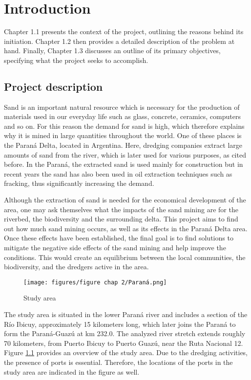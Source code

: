 \chapter{Introduction}
\label{chapter:introduction}

Chapter 1.1 presents the context of the project, outlining the reasons behind its initiation. Chapter 1.2 then provides a detailed description of the problem at hand. Finally, Chapter 1.3 discusses an outline of its primary objectives, specifying what the project seeks to accomplish.

\section{Project description}
Sand is an important natural resource which is necessary for the production of materials used in our everyday life such as glass, concrete, ceramics, computers and so on. For this reason the demand for sand is high, which therefore explains why it is mined in large quantities throughout the world. One of these places is the Paraná Delta, located in Argentina. Here, dredging companies extract large amounts of sand from the river, which is later used for various purposes, as cited before. In the Paraná, the extracted sand is used mainly for construction but in recent years the sand has also been used in oil extraction techniques such as fracking, thus significantly increasing the demand. 


Although the extraction of sand is needed for the economical development of the area, one may ask themselves what the impacts of the sand mining are for the riverbed, the biodiversity and the surrounding delta. This project aims to find out how much sand mining occurs, as well as its effects in the Paraná Delta area. Once these effects have been established, the final goal is to find solutions to mitigate the negative side effects of the sand mining and help improve the conditions. This would create an equilibrium between the local communities, the biodiversity, and the dredgers active in the area.

\begin{figure}[H]
    \centering    \texttt{[image: figures/figure chap 2/Paraná.png]}
    \caption{Study area}
    \label{fig:study area}
\end{figure}

The study area is situated in the lower Paraná river and includes a section of the Río Ibicuy, approximately 15 kilometers long, which later joins the Paraná to form the Paraná-Guazú at km 232.0. The analyzed river stretch extends roughly 70 kilometers, from Puerto Ibicuy to Puerto Guazú, near the Ruta Nacional 12. Figure \ref{fig:study area} provides an overview of the study area. Due to the dredging activities, the presence of ports is essential. Therefore, the locations of the ports in the study area are indicated in the figure as well. 



